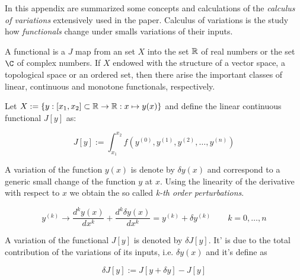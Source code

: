 In this appendix are summarized some concepts and calculations of the
\emph{calculus of variations} extensively used in the paper. Calculus of
variations is the study how \emph{functionals} change under smalls variations of
their inputs.

\begin{definition}
  \cite{Functional_Encyclopedia_of_Mathematics}
  A functional is a $J$ map from an set $X$ into the set $\operatorname{\mathbb{R}}$ of real numbers or
  the set $\C$ of complex numbers. If $X$ endowed with the structure of a vector
  space, a topological space or an ordered set, then there arise the important
  classes of linear, continuous and monotone functionals, respectively.
\end{definition}

Let $X:=\{y: [x_1, x_2] \subset \operatorname{\mathbb{R}} \rightarrow \operatorname{\mathbb{R}}: x \mapsto y(x)\}$ and define
the linear continuous functional $J[y]$ as:

\begin{equation}
  J[y] := \int_{x_1}^{x_2} f(y^{(0)}, y^{(1)}, y^{(2)}, \ldots, y^{(n)})
\end{equation}

A variation of the function $y(x)$ is denote by $\delta y(x)$ and correspond to
a generic small change of the function $y$ at $x$. Using the linearity of the
derivative with respect to $x$ we obtain the so called \emph{k-th order
perturbations}.

\begin{equation}
  y^{(k)} \rightarrow \frac{d^ky(x)}{dx^k} + \frac{d^k\delta y(x)}{dx^k} =
  y^{(k)} + \delta y^{(k)} \qquad k=0, \ldots, n
\end{equation}

A variation of the functional $J[y]$ is denoted by $\delta J[y]$. It' is due to
the total contribution of the variations of its inputs, i.e. $\delta y(x)$ and
it's define as

\begin{equation}
  \delta J[y] := J[y + \delta y] - J[y]
\end{equation}
